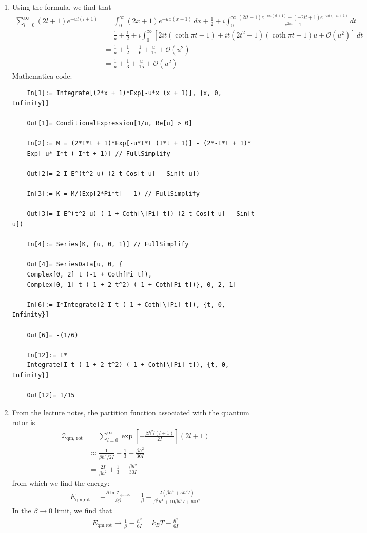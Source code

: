 \documentclass{article}
\theoremstyle{definition}
\newcommand{\p}{\partial}
\newcommand{\be}{\beta}
\newcommand{\f}[2]{\frac{#1}{#2}}
\newcommand{\lb}{\left[}
\newcommand{\rb}{\right]}
\begin{document}
\begin{enumerate}[label=(\alph*)]
	\item Using the formula, we find that 
	\begin{align*}
	\sum^\infty_{l=0} (2l+1) e^{-ul(l+1)} 
	&=   \int^\infty_0 (2x+1) e^{-ux(x+1)} \,dx + \f{1}{2} + i\int^\infty_0 \f{(2it+1) e^{-uit(it+1)}  - (-2it+1) e^{+uit(-it+1)} }{e^{2\pi t} - 1}\,dt \\
	&= \f{1}{u} + \f{1}{2} + i\int_0^\infty \lb 2it (\coth \pi t - 1) + it(2t^2 - 1)(\coth \pi t - 1) u + \mathcal{O}(u^2)  \rb \,dt \\
	&= \f{1}{u} + \f{1}{2} - \f{1}{6} + \f{u}{15} + \mathcal{O}(u^2)\\
	&= \boxed{\f{1}{u} + \f{1}{3} + \f{u}{15} + \mathcal{O}(u^2)}
	\end{align*}
	Mathematica code:
	\begin{lstlisting}
	In[1]:= Integrate[(2*x + 1)*Exp[-u*x (x + 1)], {x, 0, Infinity}]
	
	Out[1]= ConditionalExpression[1/u, Re[u] > 0]
	
	In[2]:= M = (2*I*t + 1)*Exp[-u*I*t (I*t + 1)] - (2*-I*t + 1)*
	Exp[-u*-I*t (-I*t + 1)] // FullSimplify
	
	Out[2]= 2 I E^(t^2 u) (2 t Cos[t u] - Sin[t u])
	
	In[3]:= K = M/(Exp[2*Pi*t] - 1) // FullSimplify
	
	Out[3]= I E^(t^2 u) (-1 + Coth[\[Pi] t]) (2 t Cos[t u] - Sin[t u])
	
	In[4]:= Series[K, {u, 0, 1}] // FullSimplify
	
	Out[4]= SeriesData[u, 0, {
	Complex[0, 2] t (-1 + Coth[Pi t]), 
	Complex[0, 1] t (-1 + 2 t^2) (-1 + Coth[Pi t])}, 0, 2, 1]
	
	In[6]:= I*Integrate[2 I t (-1 + Coth[\[Pi] t]), {t, 0, Infinity}]
	
	Out[6]= -(1/6)
	
	In[12]:= I*
	Integrate[I t (-1 + 2 t^2) (-1 + Coth[\[Pi] t]), {t, 0, Infinity}]
	
	Out[12]= 1/15
	\end{lstlisting}
	
	\item From the lecture notes, the partition function associated with the quantum rotor is 
	\begin{align*}
	\mathcal{Z}_{\text{qm, rot}} 
	&= \sum^\infty_{l=0} \exp
	\lb -\f{\be\hbar^2 l(l+1)}{2I} \rb (2l+1) \\
	&\approx \f{1}{\be \hbar^2/2I} + \f{1}{3} + \f{\be\hbar^2}{30I} \\
	&= {\f{2I}{\be \hbar^2} + \f{1}{3} + \f{\be\hbar^2}{30 I}}
	\end{align*}
	from which we find the energy:
	\begin{align*}
	E_\text{qm,rot} = -\f{\p \ln \mathcal{Z}_{\text{qm,rot}}}{\p \be} = {\f{1}{\be} - \f{2(\be \hbar^4 + 5 \hbar^2 I )}{\be^2 \hbar^4 + 10 \be \hbar^2 I + 60 I^2}}
	\end{align*}
	In the $\be \to 0$ limit, we find that
	\begin{align*}
	E_\text{qm,rot} \to \f{1}{\be} - \f{\hbar^2}{6I} = \boxed{k_B T - \f{\hbar^2}{6I}}
	\end{align*}
	

\end{enumerate}
\end{document}
